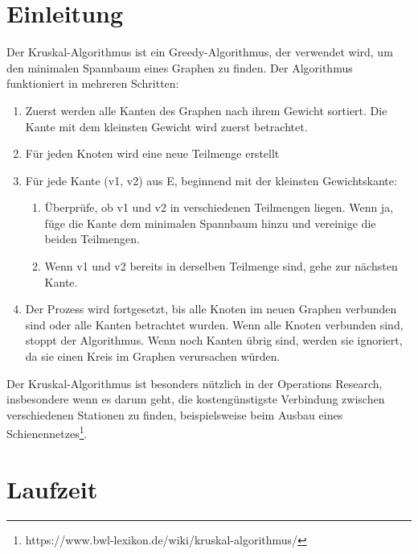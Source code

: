 \documentclass[a4paper]{article}
\begin{document}
	

\newpage

\tableofcontents

\newpage

\section{Einleitung}

Der Kruskal-Algorithmus ist ein Greedy-Algorithmus, der verwendet wird, um den minimalen Spannbaum eines Graphen zu finden. Der Algorithmus funktioniert in mehreren Schritten:

\begin{enumerate} \label{Einleitung}
    \item Zuerst werden alle Kanten des Graphen nach ihrem Gewicht sortiert. Die Kante mit dem kleinsten Gewicht wird zuerst betrachtet. 

    \item Für jeden Knoten wird eine neue Teilmenge erstellt
    
    \item Für jede Kante (v1, v2) aus E, beginnend mit der kleinsten Gewichtskante:
    
        \begin{enumerate}
            \item Überprüfe, ob v1 und v2 in verschiedenen Teilmengen liegen. Wenn ja, füge die Kante dem minimalen Spannbaum hinzu und vereinige die beiden Teilmengen.
            \item Wenn v1 und v2 bereits in derselben Teilmenge sind, gehe zur nächsten Kante.
        \end{enumerate}
    
     \item Der Prozess wird fortgesetzt, bis alle Knoten im neuen Graphen verbunden sind oder alle Kanten betrachtet wurden. Wenn alle Knoten verbunden sind, stoppt der Algorithmus. Wenn noch Kanten übrig sind, werden sie ignoriert, da sie einen Kreis im Graphen verursachen würden.
\end{enumerate}

Der Kruskal-Algorithmus ist besonders nützlich in der Operations Research, insbesondere wenn es darum geht, die kostengünstigste Verbindung zwischen verschiedenen Stationen zu finden, beispielsweise beim Ausbau eines Schienennetzes\footnote{https://www.bwl-lexikon.de/wiki/kruskal-algorithmus/}. \\

\section{Laufzeit}
\end{document}
